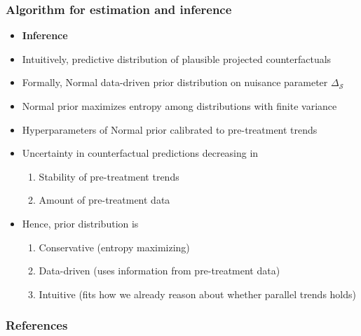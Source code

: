 \documentclass[table, xcolor = {dvipsnames}, 9pt]{beamer}
\theoremstyle{plain}
\begin{document}
\begin{frame}[t]
\frametitle{Algorithm for estimation and inference}
\vfill 
\begin{itemize}
\item[] \textbf{Inference} \vfill
\item \pause Intuitively, predictive distribution of plausible projected counterfactuals \vfill
\item \pause Formally, Normal data-driven prior distribution on nuisance parameter $\Delta_{\mathcal{S}}$ \vfill
\item \pause Normal prior maximizes entropy among distributions with finite variance \\ \citep{coverthomas1991} \vfill
\item \pause Hyperparameters of Normal prior calibrated to pre-treatment trends \vfill
\item \pause Uncertainty in counterfactual predictions decreasing in \vfill
\begin{enumerate}
\item \pause Stability of pre-treatment trends \vfill
\item \pause Amount of pre-treatment data \vfill
\end{enumerate} 
\item \pause Hence, prior distribution is \vfill
\begin{enumerate}
\item \pause Conservative (entropy maximizing) \vfill
\item \pause Data-driven (uses information from pre-treatment data) \vfill
\item \pause Intuitive (fits how we already reason about whether parallel trends holds) \vfill
\end{enumerate} 
\end{itemize}
\vfill
\end{frame}
\begin{frame}[allowframebreaks]
\frametitle{References} 
\scriptsize

\end{frame}
\end{document}
